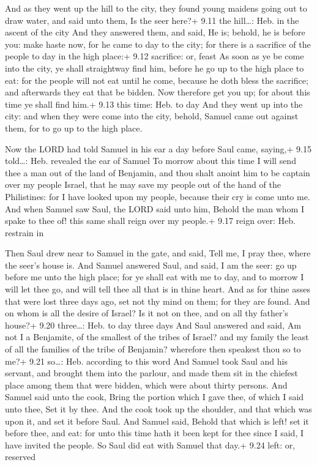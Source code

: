  And as they went up the hill to the city, they found
young maidens going out to draw water, and said unto them, Is the seer
here?+ 9.11 the hill\ldots: Heb. in the ascent of the city 
And they answered them, and said, He is; behold, he is before you: make
haste now, for he came to day to the city; for there is a sacrifice of
the people to day in the high place:+ 9.12 sacrifice: or, feast
 As soon as ye be come into the city, ye shall straightway
find him, before he go up to the high place to eat: for the people will
not eat until he come, because he doth bless the sacrifice; and
afterwards they eat that be bidden. Now therefore get you up; for about
this time ye shall find him.+ 9.13 this time: Heb. to day 
And they went up into the city: and when they were come into the city,
behold, Samuel came out against them, for to go up to the high place.

 Now the LORD had told Samuel in his ear a day before
Saul came, saying,+ 9.15 told\ldots: Heb. revealed the ear of Samuel
 To morrow about this time I will send thee a man out of
the land of Benjamin, and thou shalt anoint him to be captain over my
people Israel, that he may save my people out of the hand of the
Philistines: for I have looked upon my people, because their cry is come
unto me.  And when Samuel saw Saul, the LORD said unto him,
Behold the man whom I spake to thee of! this same shall reign over my
people.+ 9.17 reign over: Heb. restrain in

 Then Saul drew near to Samuel in the gate, and said, Tell
me, I pray thee, where the seer's house is.  And Samuel
answered Saul, and said, I am the seer: go up before me unto the high
place; for ye shall eat with me to day, and to morrow I will let thee
go, and will tell thee all that is in thine heart.  And as
for thine asses that were lost three days ago, set not thy mind on them;
for they are found. And on whom is all the desire of Israel? Is it not
on thee, and on all thy father's house?+ 9.20 three\ldots: Heb. to day
three days  And Saul answered and said, Am not I a
Benjamite, of the smallest of the tribes of Israel? and my family the
least of all the families of the tribe of Benjamin? wherefore then
speakest thou so to me?+ 9.21 so\ldots: Heb. according to this word
 And Samuel took Saul and his servant, and brought them
into the parlour, and made them sit in the chiefest place among them
that were bidden, which were about thirty persons.  And
Samuel said unto the cook, Bring the portion which I gave thee, of which
I said unto thee, Set it by thee.  And the cook took up the
shoulder, and that which was upon it, and set it before Saul. And Samuel
said, Behold that which is left! set it before thee, and eat: for unto
this time hath it been kept for thee since I said, I have invited the
people. So Saul did eat with Samuel that day.+ 9.24 left: or, reserved

